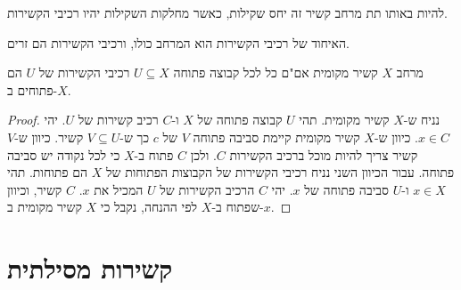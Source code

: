 \documentclass{tstextbook}
\begin{document}
\begin{proposition}
להיות באותו תת מרחב קשיר זה יחס שקילות, כאשר מחלקות השקילות יהיו רכיבי הקשירות.

\end{proposition}
\begin{corollary}
האיחוד של רכיבי הקשירות הוא המרחב כולו, ורכיבי הקשירות הם זרים.

\end{corollary}
\begin{proposition}
מרחב \(X\) קשיר מקומית אם"ם כל לכל קבוצה פתוחה \(U\subseteq X\) רכיבי הקשירות של \(U\) הם פתוחים ב-\(X\).

\end{proposition}
\begin{proof}
נניח ש-\(X\) קשיר מקומית. תהי \(U\) קבוצה פתוחה של \(X\) ו-\(C\) רכיב קשירות של \(U\). יהי \(x \in C\). כיוון ש-\(X\) קשיר מקומית קיימת סביבה פתוחה \(V\) של \(c\) כך ש-\(V\subseteq U\) קשיר. כיוון ש-\(V\) קשיר צריך להיות מוכל ברכיב הקשירות \(C\). ולכן \(C\) פתוח ב-\(X\) כי לכל נקודה יש סביבה פתוחה.
עבור הכיוון השני נניח רכיבי הקשירות של הקבוצות הפתוחות של \(X\) הם פתוחות. תהי \(x \in X\) ו-\(U\) סביבה פתוחה של \(x\). יהי \(C\) הרכיב הקשירות של \(U\) המכיל את \(x\). \(C\) קשיר, וכיוון שפתוח ב-\(X\) לפי ההנחה, נקבל כי \(X\) קשיר מקומית ב-\(x\).

\end{proof}
\section{קשירות מסילתית}
\end{document}
